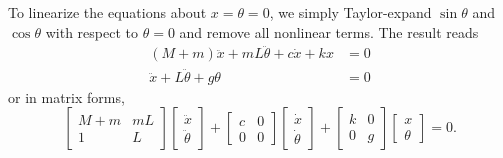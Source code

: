 \begin{enumerate}[(i)]
{    To linearize the equations about $x = \theta = 0$, we simply Taylor-expand $\sin\theta$ and $\cos\theta$ with respect to $\theta = 0$ and remove all nonlinear terms. 
    The result reads 
    \begin{equation}
    \begin{aligned}
        (M+m)\ddot{x} + mL \ddot{\theta} + c\dot{x} + kx &= 0 \\
        \ddot{x} + L\ddot{\theta} + g\theta &= 0
    \end{aligned}
    \end{equation}
    or in matrix forms,
    \begin{equation}
    \boxed{
        \begin{bmatrix} M+m & mL \\ 1 & L \end{bmatrix}
        \begin{bmatrix} \ddot{x} \\ \ddot{\theta} \end{bmatrix}
        + 
        \begin{bmatrix} c & 0 \\ 0 & 0\end{bmatrix}
        \begin{bmatrix} \dot{x} \\ \dot{\theta}\end{bmatrix}
        + 
        \begin{bmatrix} k & 0 \\ 0 & g \end{bmatrix}
        \begin{bmatrix} x \\ \theta \end{bmatrix} = 0
    }.
    \end{equation}
}
\end{enumerate}

